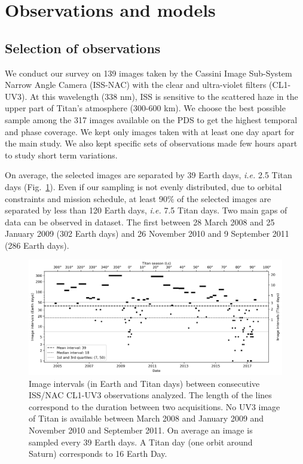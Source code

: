 \section{Observations and models}

\subsection{Selection of observations}
We conduct our survey on 139 images taken by the Cassini Image Sub-System Narrow Angle Camera (ISS-NAC) with the
clear and ultra-violet filters (CL1-UV3). At this wavelength (338 nm), ISS is sensitive to the scattered haze in the
upper part of Titan's atmosphere (300-600 km). We choose the best possible sample among the 317 images available on the PDS
to get the highest temporal and phase coverage. We kept only images taken with at least one day apart for the main study.
We also kept specific sets of observations made few hours apart to study short term variations.

On average, the selected images are separated by 39 Earth days, \textit{i.e.} 2.5 Titan days (Fig.~\ref{fig:img_sampling}).
Even if our sampling is not evenly distributed, due to orbital constraints and mission schedule, at least 90\% of the selected
images are separated by less than 120 Earth days, \textit{i.e.} 7.5 Titan days. Two main gaps of data can be observed in dataset.
The first between 28 March 2008 and 25 January 2009 (302 Earth days) and 26 November 2010 and 9 September 2011 (286 Earth days).

\begin{figure}[!ht]
    \centering
    \includegraphics[width=\textwidth]{Fig/IMG_interval.png}
    \caption{Image intervals (in Earth and Titan days) between consecutive ISS/NAC CL1-UV3 observations analyzed.
        The length of the lines correspond to the duration between two acquisitions. No UV3 image of Titan is
        available between March 2008 and January 2009 and November 2010 and September 2011.
        On average an image is sampled every 39 Earth days. A Titan day (one orbit around Saturn) corresponds to 16 Earth Day.}
    \label{fig:img_sampling}
\end{figure}

